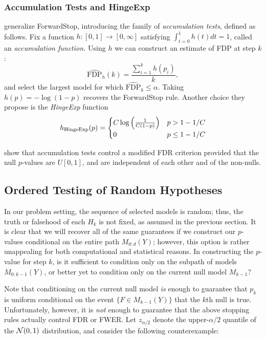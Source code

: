 \documentclass{article}
\begin{document}
\subsubsection{Accumulation Tests and HingeExp}

\citet{li2015accumulation} generalize ForwardStop, introducing the family of {\em accumulation tests}, defined as follows.
Fix a function $h: [0,1] \rightarrow [0,\infty]$ satisfying $\int_{t=0}^1 h(t)dt=1$, called an {\em accumulation function.} Using $h$ we can construct an estimate of FDP at step $k$:
\begin{equation}
\widehat{\text{FDP}}_h(k)= \frac{\sum_{i=1}^k h(p_i)}{k},
\end{equation}
and select the largest model for which $\widehat{\text{FDP}}_k \leq \alpha$. Taking $h(p)=-\log(1-p)$ recovers the ForwardStop rule. Another choice they propose is the {\em HingeExp} function
\begin{equation}
  h_{\rm HingeExp}(p)= 
  \begin{cases} 
    C\log\left(\frac{1}{C(1-p)} \right)& p> 1-1/C\\
    0 & p\leq 1-1/C
  \end{cases}
\end{equation}

\citet{li2015accumulation} show that accumulation tests control a modified FDR criterion provided that the null $p$-values are $U[0,1]$, and are independent of each other and of the non-nulls.

\subsection{Ordered Testing of Random Hypotheses}

In our problem setting, the sequence of selected models is random; thus, the truth or falsehood of each $H_k$ is not fixed, as assumed in the previous section. It is clear that we will recover all of the same guarantees if we construct our $p$-values conditional on the entire path $M_{0:d}(Y)$; however, this option is rather unappealing for both computational and statistical reasons. In constructing the $p$-value for step $k$, is it sufficient to condition only on the subpath of models $M_{0:k-1}(Y)$, or better yet to condition only on the current null model $M_{k-1}$?

Note that conditioning on the current null model {\em is} enough to guarantee that $p_k$ is uniform conditional on the event $\{F\in M_{k-1}(Y)\}$ that the $k$th null is true. Unfortunately, however, it is {\em not} enough to guarantee that the above stopping rules actually control FDR or FWER. Let $z_{\alpha/2}$ denote the upper-$\alpha/2$ quantile of the $\mathcal{N}(0,1)$ distribution, and consider the following counterexample:
\end{document}
